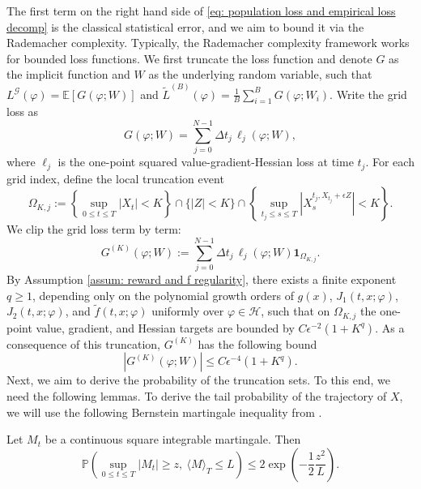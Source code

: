 \documentclass[twoside,11pt]{article}
\newcommand{\E}{\mathbb{E}}
\newcommand{\p}{\mathbb{P}}
\newcommand{\1}{\mathbf{1}}
\numberwithin{equation}{section}
\begin{document}
The first term on the right hand side of \eqref{eq: population loss and empirical loss decomp} is the classical statistical error, and  we aim to bound it via the Rademacher complexity. Typically, the Rademacher complexity framework works for bounded loss functions. We first truncate the loss function and denote $ G$ as the implicit function and $ W$ as the underlying random variable, such that $ L^{\mathscr{G}}(\varphi) = \E[G(\varphi;W)]$ and $ \tilde L^{(B)}(\varphi) = \frac{1}{B}\sum_{i=1}^B G(\varphi;W_i)$.
Write the grid loss as
\[
    G(\varphi;W)
    =
    \sum_{j=0}^{N-1}\Delta t_j\,\ell_j(\varphi;W),
\]
where $\ell_j$ is the one-point squared value-gradient-Hessian loss at time
$t_j$.  For each grid index, define the local truncation event
\[
    \Omega_{K,j}
    :=
    \left\{\sup_{0\le t\le T}|X_t|<K\right\}
    \cap
    \{|Z|<K\}
    \cap
    \left\{
    \sup_{t_j\le s\le T}
    \left|X_s^{t_j,X_{t_j}+\epsilon Z}\right|<K
    \right\}.
\]
We clip the grid loss term by term:
\begin{equation}
    G^{(K)}(\varphi;W)
    :=
    \sum_{j=0}^{N-1}
    \Delta t_j\,\ell_j(\varphi;W)\1_{\Omega_{K,j}} .
\end{equation}
By Assumption \ref{assum: reward and f regularity}, there exists a finite exponent $q\ge1$, depending only on the polynomial growth orders of $g(x)$, $J_1(t,x;\varphi)$, $J_2(t,x;\varphi)$, and $\tilde f(t,x;\varphi)$ uniformly over $\varphi\in\mathcal H$, such that on $\Omega_{K,j}$ the one-point value, gradient, and Hessian targets are bounded by $ C\epsilon^{-2}(1+K^{q})$. As a consequence of this truncation, $ G^{(K)}$ has the following bound
\begin{equation}
    |G^{(K)}(\varphi;W)|
    \le
    C\epsilon^{-4}(1+K^{q}) .
\end{equation}
Next, we aim to derive the probability of the truncation sets. To this end, we need the following lemmas.
To derive the tail probability of the trajectory of $ X$, we will use the following Bernstein martingale inequality from \cite{dzhaparidze_bernstein-type_2001}.
\begin{lemma}\label{lemma: bernstein inequality}
    Let $ M_t$ be a continuous square integrable martingale. Then
    \begin{equation}
        \p\left( \sup_{0\le t\le T}|M_t| \ge z, \ \langle M\rangle_T \le L\right) \le 2\exp\left( -\frac{1}{2}\frac{z^2}{L}\right).
    \end{equation}
\end{lemma}
\end{document}
